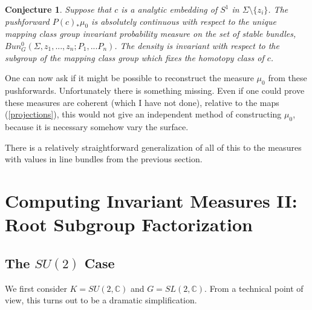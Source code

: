 \documentclass{amsart}
\theoremstyle{conjecture}
\newtheorem{conjecture}{Conjecture}
\theoremstyle{definition}
\theoremstyle{question}
\theoremstyle{questions}
\theoremstyle{remark}
\theoremstyle{remarks}
\theoremstyle{example}
\numberwithin{equation}{section}
\begin{document}
\begin{conjecture} Suppose that $c$ is a analytic embedding of $S^1$ in $\Sigma\setminus\{z_i\}$. The pushforward  $P(c)_*\mu_0$ is absolutely continuous with respect to the unique mapping class group invariant probability measure on the set of stable bundles, $Bun_G^0(\Sigma,z_1,...,z_n;P_1,...P_n)$. The density is
invariant with respect to the subgroup of the mapping class group which fixes the homotopy class of $c$.
\end{conjecture}

One can now ask if it might be possible to reconstruct the measure $\mu_0$ from these pushforwards.
Unfortunately there is something missing. Even if one could prove these measures are coherent (which I have not done), relative to the maps (\ref{projections}), this would not give an independent method of constructing $\mu_0$, because it is necessary somehow vary the surface.

There is a relatively straightforward generalization of all of this to the measures with values in line bundles from the previous section.

\section{Computing Invariant Measures II: Root Subgroup Factorization}\label{calculate2}



\subsection{The $SU(2)$ Case}

We first consider $K=SU(2,\mathbb C)$ and $G=SL(2,\mathbb C)$. From a technical point of view, this turns out to be
a dramatic simplification.
\end{document}
